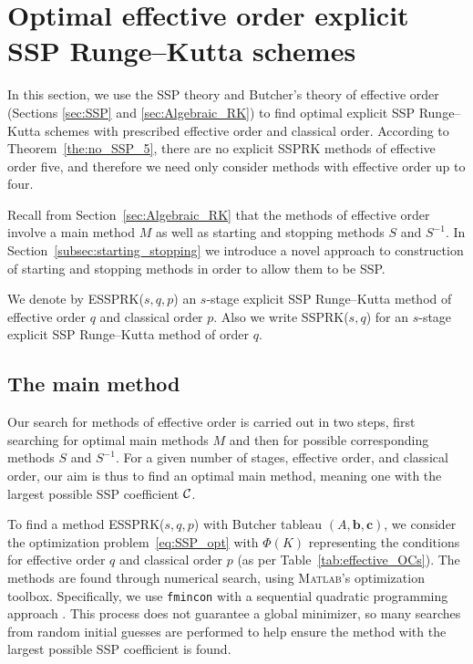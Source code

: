 \section{Optimal effective order explicit SSP Runge--Kutta schemes}\label{sec:optimal_ESSPRK}
In this section, we use the SSP theory and Butcher's theory of effective
order (Sections \ref{sec:SSP} and \ref{sec:Algebraic_RK}) to find
optimal explicit SSP Runge--Kutta schemes with prescribed effective
order and classical order.
According to Theorem~\ref{the:no_SSP_5}, there are no explicit SSPRK methods of
effective order five, and therefore we need only consider methods with
effective order up to four.

Recall from Section~\ref{sec:Algebraic_RK} that the methods of
effective order involve a main method $M$ as well as starting and
stopping methods $S$ and $S^{-1}$.
In Section~\ref{subsec:starting_stopping} we introduce a novel approach
to construction of starting and stopping methods in order to allow
them to be SSP.

We denote by ESSPRK($s,q,p$) an $s$-stage explicit SSP Runge--Kutta
method of effective order $q$ and classical order $p$.
Also we write SSPRK($s,q$) for an $s$-stage explicit SSP Runge--Kutta
method of order $q$.

\subsection{The main method}\label{subsec:main_method}

Our search for methods of effective order is carried out in two
steps, first searching for optimal main methods $M$ and then for
possible corresponding methods $S$ and $S^{-1}$.
For a given number of stages, effective order, and classical order,
our aim is thus to find an optimal main method, meaning one with the 
largest possible SSP coefficient $\mathcal{C}$.

To find a method ESSPRK($s,q,p$) with Butcher tableau $(A, \bm{b},
\bm{c})$, we consider the optimization problem~\eqref{eq:SSP_opt} 
with $\Phi(K)$ representing the conditions for effective order
$q$ and classical order $p$ (as per Table~\ref{tab:effective_OCs}).
The methods are found through numerical search, using 
\textsc{Matlab}'s optimization toolbox.
Specifically, we use \texttt{fmincon} with a sequential quadratic 
programming approach \cite{Ketcheson2008, Ketcheson/Macdonald/Gottlieb:2009}.
This process does not guarantee a global minimizer, so many searches 
from random initial guesses are performed to help ensure the method with
the largest possible SSP coefficient is found.

